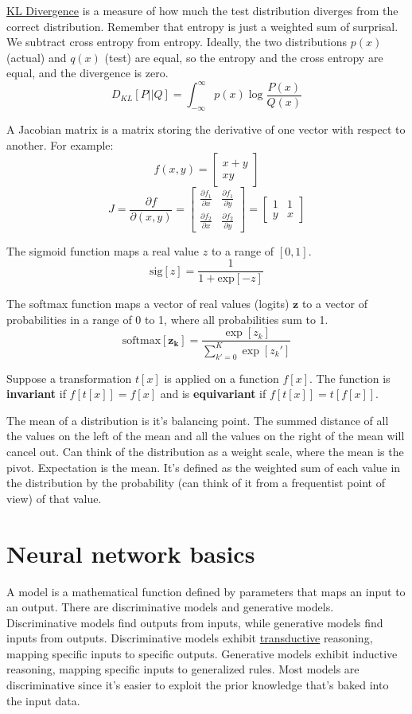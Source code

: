 \documentclass{article}
\begin{document}
\href{https://www.datacamp.com/tutorial/kl-divergence}{KL Divergence} is a measure of how much the test distribution diverges from the correct distribution. Remember that entropy is just a weighted sum of surprisal. We subtract cross entropy from entropy. Ideally, the two distributions $p(x)$ (actual) and $q(x)$ (test) are equal, so the entropy and the cross entropy are equal, and the divergence is zero.
\[ D_{KL}[P || Q] = \int_{-\infty}^{\infty} p(x)\log{\frac{P(x)}{Q(x)}} \]

A Jacobian matrix is a matrix storing the derivative of one vector with respect to another. For example:
\[ f(x, y) = \begin{bmatrix} x + y \\ xy \end{bmatrix} \]
\[ J = \frac{\partial f}{\partial (x, y)} = \begin{bmatrix} \frac{\partial f_1}{\partial x} & \frac{\partial f_1}{\partial y} \\ \frac{\partial f_2}{\partial x} & \frac{\partial f_2}{\partial y} \end{bmatrix} = \begin{bmatrix} 1 & 1 \\ y & x \end{bmatrix} \]

The sigmoid function maps a real value $z$ to a range of $[0, 1]$.
\[ \text{sig}[z] = \frac{1}{1 + \text{exp}[-z]} \]

The softmax function maps a vector of real values (logits) $\mathbf{z}$ to a vector of probabilities in a range of 0 to 1, where all probabilities sum to 1.
\[ \text{softmax}[\mathbf{z_k}] = \frac{\exp[z_k]}{\sum_{k' = 0}^{K} \exp[z_k']} \]

Suppose a transformation $t[x]$ is applied on a function $f[x]$. The function is \textbf{invariant} if $f[t[x]] = f[x]$ and is \textbf{equivariant} if $f[t[x]] = t[f[x]]$.

The mean of a distribution is it's balancing point. The summed distance of all the values on the left of the mean and all the values on the right of the mean will cancel out. Can think of the distribution as a weight scale, where the mean is the pivot. Expectation is the mean. It's defined as the weighted sum of each value in the distribution by the probability (can think of it from a frequentist point of view) of that value.

\section{Neural network basics}
A model is a mathematical function defined by parameters that maps an input to an output. There are discriminative models and generative models. Discriminative models find outputs from inputs, while generative models find inputs from outputs. Discriminative models exhibit \href{https://en.wikipedia.org/wiki/Transduction_(machine_learning)}{transductive} reasoning, mapping specific inputs to specific outputs. Generative models exhibit inductive reasoning, mapping specific inputs to generalized rules. Most models are discriminative since it's easier to exploit the prior knowledge that's baked into the input data.
\end{document}
